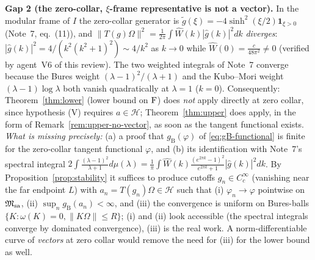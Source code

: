 \documentclass[11pt]{article}
\newcommand{\Om}{\Omega}
\newcommand{\Hil}{\mathcal H}
\newcommand{\Msa}{\cM_{\mathrm{sa}}}
\newcommand{\gB}{g_{\mathrm B}}
\newcommand{\norm}[1]{\lVert #1\rVert}
\begin{document}
\begin{verdictgap}
\textbf{Gap 2 (the zero-collar, $\xi$-frame representative is not a vector).}  In the modular frame of $I$ the
zero-collar generator is $\widetilde g(\xi)=-4\sinh^2(\xi/2)\mathbf 1_{\xi>0}$ (Note~7, eq.~(11)), and
$\norm{T(g)\Om}^2=\frac1{2\pi}\int\widehat W(k)|\widehat g(k)|^2dk$ \emph{diverges}: $|\widehat g(k)|^2=4/(k^2(k^2+1)^2)
\sim4/k^2$ as $k\to0$ while $\widehat W(0)=\frac{c}{48\pi^2}\ne0$ (verified by agent~V6 of this review).  The two
weighted integrals of Note~7 converge because the Bures weight $(\lambda-1)^2/(\lambda+1)$ and the Kubo--Mori weight
$(\lambda-1)\log\lambda$ both vanish quadratically at $\lambda=1$ ($k=0$).  Consequently:
Theorem~\ref{thm:lower} (lower bound on $\operatorname{F}$) does \emph{not} apply directly at zero collar, since hypothesis (V)
requires $a\in\Hil$; Theorem~\ref{thm:upper} does apply, in the form of Remark~\ref{rem:upper-no-vector}, as soon as
the tangent functional exists.  \emph{What is missing precisely:} (a) a proof that $\gB(\varphi)$ of
\eqref{eq:gB-functional} is finite for the zero-collar tangent functional $\varphi$, and (b) its identification with
Note~7's spectral integral $2\int\frac{(\lambda-1)^2}{\lambda+1}d\mu(\lambda)
=\frac1\pi\int\widehat W(k)\frac{(e^{2\pi k}-1)^2}{e^{2\pi k}+1}|\widehat g(k)|^2dk$.  By
Proposition~\ref{prop:stability} it suffices to produce cutoffs $g_n\in C^\infty_c$ (vanishing near the far endpoint
$L$) with $a_n=T(g_n)\Om\in\Hil$ such that (i) $\varphi_n\to\varphi$ pointwise on $\Msa$, (ii)
$\sup_n\gB(a_n)<\infty$, and (iii) the convergence is uniform on Bures-balls
$\{K:\omega(K)=0,\norm{K\Om}\le R\}$; (i) and (ii) look accessible (the spectral integrals converge by dominated
convergence), (iii) is the real work.  A norm-differentiable curve of \emph{vectors} at zero collar would remove the
need for (iii) for the lower bound as well.
\end{verdictgap}
\end{document}
